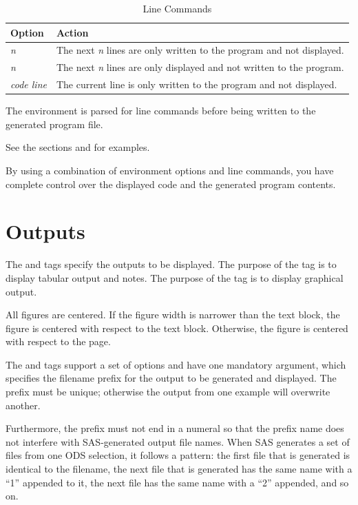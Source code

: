 \documentclass[article,oneside]{memoir}
\begin{document}
\begin{table}[H]
\caption{ Line Commands}\label{lcmd}
\begin{tabular}{lP{3.5in}}
\hline
\textbf{Option}  &  \textbf{Action} \\
\hline
  \textit{n} \Code{;} & The next \textit{n} lines are only written to
                                          the program and not displayed.\\[0.5\baselineskip]
  \textit{n} \Code{;} & The next \textit{n} lines are only displayed
                                          and not written to the program.\\[0.5\baselineskip]
 \Code{\%*;} \textit{code line}  & The current line is only written to the
                                      program and not displayed.\\
\hline
\end{tabular}
\end{table}

  The  environment is parsed for line commands before being written
  to the generated program file.

See the sections  and  for examples.


  By using a combination of environment options and line commands, you have
  complete control over the displayed code and the generated program contents.

\section{Outputs}
The  and  tags specify the outputs to be displayed.
The purpose of the  tag is to display tabular output and notes.
The purpose of the  tag is to display graphical output.

     All figures are centered. If the figure width is narrower than the text block, the
     figure is centered with respect to the text block. Otherwise, the figure is
     centered with respect to the page.

     The  and  tags support a set of options and have one
     mandatory argument, which specifies the filename prefix for the output
     to be generated and displayed.
     The prefix must be unique; otherwise the output from one example will
     overwrite another.

     Furthermore, the prefix must not end in a numeral so that the prefix name does not interfere
     with SAS-generated output file names.
    When SAS generates a set of files from one ODS selection, it follows a
    pattern: the first file that is generated is identical to the filename, the next
    file that is generated has the same name with a ``1'' appended to it, the next file
    has the same name with a ``2'' appended, and so on.
\end{document}
